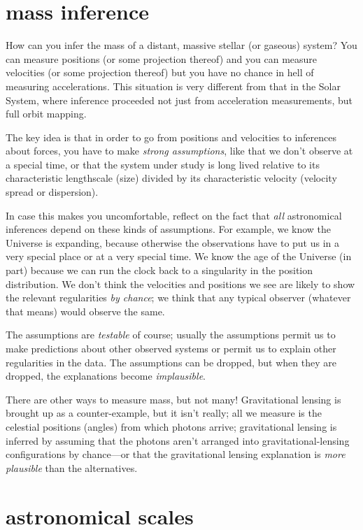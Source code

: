 \documentclass[12pt]{article}
\begin{document}
\section{mass inference}

How can you infer the mass of a distant, massive stellar (or gaseous)
system?  You can measure positions (or some projection thereof) and
you can measure velocities (or some projection thereof) but you have
no chance in hell of measuring accelerations.  This situation is very
different from that in the Solar System, where inference proceeded not
just from acceleration measurements, but full orbit mapping.

The key idea is that in order to go from positions and velocities to
inferences about forces, you have to make \emph{strong assumptions},
like that we don't observe at a special time, or that the system under
study is long lived relative to its characteristic lengthscale (size)
divided by its characteristic velocity (velocity spread or
dispersion).

In case this makes you uncomfortable, reflect on the fact that
\emph{all} astronomical inferences depend on these kinds of
assumptions.  For example, we know the Universe is expanding, because
otherwise the observations have to put us in a very special place or
at a very special time.  We know the age of the Universe (in part)
because we can run the clock back to a singularity in the position
distribution.  We don't think the velocities and positions we see are
likely to show the relevant regularities \emph{by chance}; we think
that any typical observer (whatever that means) would observe the
same.

The assumptions are \emph{testable} of course; usually the assumptions
permit us to make predictions about other observed systems or permit
us to explain other regularities in the data.  The assumptions can be
dropped, but when they are dropped, the explanations become
\emph{implausible}.

There are other ways to measure mass, but not many!  Gravitational
lensing is brought up as a counter-example, but it isn't really; all
we measure is the celestial positions (angles) from which photons
arrive; gravitational lensing is inferred by assuming that the photons
aren't arranged into gravitational-lensing configurations by
chance---or that the gravitational lensing explanation is
\emph{more plausible} than the alternatives.

\section{astronomical scales}
\end{document}
